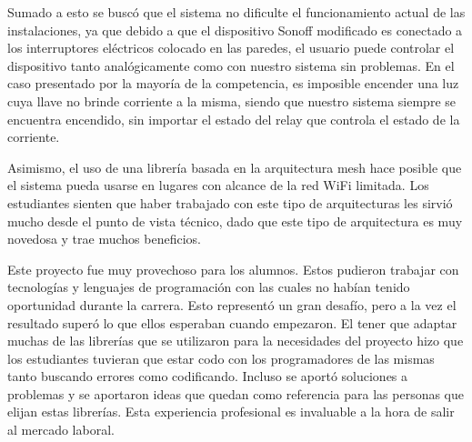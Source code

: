Sumado a esto se buscó que el sistema no dificulte el funcionamiento actual de las instalaciones, ya que debido a que el dispositivo Sonoff modificado es conectado a los interruptores eléctricos colocado en las paredes, el usuario puede controlar el dispositivo tanto analógicamente como con nuestro sistema sin problemas. En el caso presentado por la mayoría de la competencia, es imposible encender una luz cuya llave no brinde corriente a la misma, siendo que nuestro sistema siempre se encuentra encendido, sin importar el estado del relay que controla el estado de la corriente.

Asimismo, el uso de una librería basada en la arquitectura mesh hace posible que el sistema pueda usarse en lugares con alcance de la red WiFi limitada. Los estudiantes sienten que haber trabajado con este tipo de arquitecturas les sirvió mucho desde el punto de vista técnico, dado que este tipo de arquitectura es muy novedosa y trae muchos beneficios.

Este proyecto fue muy provechoso para los alumnos. Estos pudieron trabajar con tecnologías y lenguajes de programación con las cuales no habían tenido oportunidad durante la carrera. Esto representó un gran desafío, pero a la vez el resultado superó lo que ellos esperaban cuando empezaron. El tener que adaptar muchas de las librerías que se utilizaron para la necesidades del proyecto hizo que los estudiantes tuvieran que estar codo con los programadores de las mismas tanto buscando errores como codificando. Incluso se aportó soluciones a problemas y se aportaron ideas que quedan como referencia para las personas que elijan estas librerías. Esta experiencia profesional es invaluable a la hora de salir al mercado laboral.
